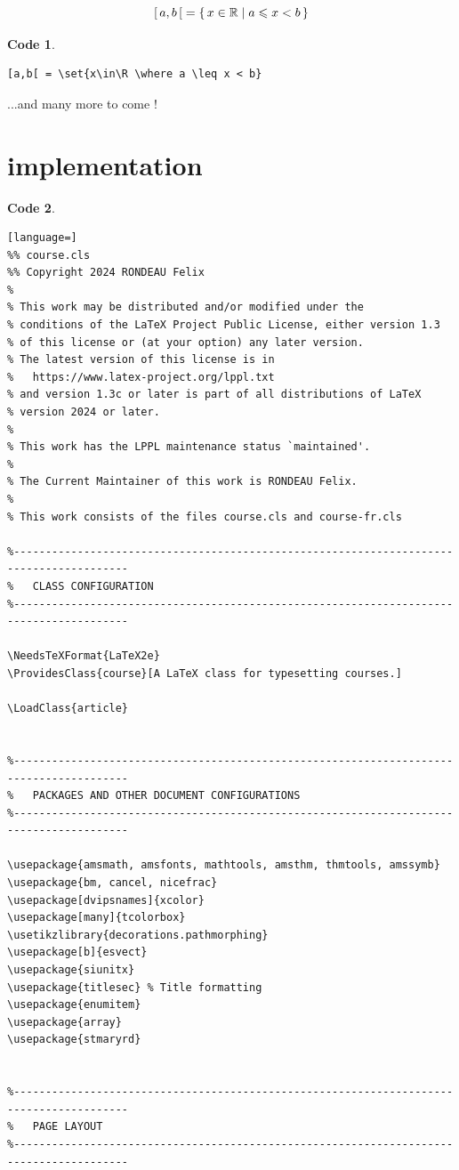 \documentclass{course}
\theoremstyle{unnumbered}
\newtheorem{code}{Code}
\begin{document}
\[
	[\,a,b\,[ \;= \{\,x\in\mathbb{R} \mid a \leqslant x < b\,\}
\]
\begin{code}
	\begin{lstlisting}
[a,b[ = \set{x\in\R \where a \leq x < b}
\end{lstlisting}
\end{code}

\noindent ...and many more to come !

\pagebreak
\section{implementation}
\begin{code}
	\begin{lstlisting}[language=]
%% course.cls
%% Copyright 2024 RONDEAU Felix
%
% This work may be distributed and/or modified under the
% conditions of the LaTeX Project Public License, either version 1.3
% of this license or (at your option) any later version.
% The latest version of this license is in
%   https://www.latex-project.org/lppl.txt
% and version 1.3c or later is part of all distributions of LaTeX
% version 2024 or later.
%
% This work has the LPPL maintenance status `maintained'.
%
% The Current Maintainer of this work is RONDEAU Felix.
%
% This work consists of the files course.cls and course-fr.cls

%----------------------------------------------------------------------------------------
%	CLASS CONFIGURATION
%----------------------------------------------------------------------------------------

\NeedsTeXFormat{LaTeX2e}
\ProvidesClass{course}[A LaTeX class for typesetting courses.]

\LoadClass{article}


%----------------------------------------------------------------------------------------
%	PACKAGES AND OTHER DOCUMENT CONFIGURATIONS
%----------------------------------------------------------------------------------------

\usepackage{amsmath, amsfonts, mathtools, amsthm, thmtools, amssymb}
\usepackage{bm, cancel, nicefrac}
\usepackage[dvipsnames]{xcolor}
\usepackage[many]{tcolorbox}
\usetikzlibrary{decorations.pathmorphing}
\usepackage[b]{esvect}
\usepackage{siunitx}
\usepackage{titlesec} % Title formatting
\usepackage{enumitem}
\usepackage{array}
\usepackage{stmaryrd}


%----------------------------------------------------------------------------------------
%	PAGE LAYOUT
%----------------------------------------------------------------------------------------


\end{lstlisting}
\end{code}
\end{document}
